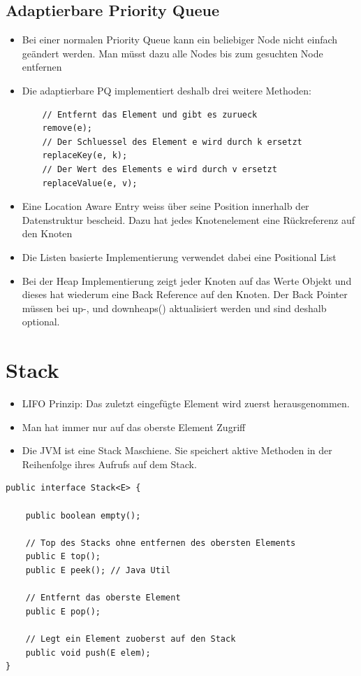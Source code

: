 \subsection{Adaptierbare Priority Queue} 
\begin{itemize}
	\item Bei einer normalen Priority Queue kann ein beliebiger Node nicht einfach geändert werden. Man müsst dazu alle Nodes bis zum gesuchten Node entfernen
	\item Die adaptierbare PQ implementiert deshalb drei weitere Methoden:
	\begin{lstlisting}
	// Entfernt das Element und gibt es zurueck
	remove(e);
	// Der Schluessel des Element e wird durch k ersetzt
	replaceKey(e, k);
	// Der Wert des Elements e wird durch v ersetzt
	replaceValue(e, v);
	\end{lstlisting}
	\item Eine Location Aware Entry weiss über seine Position innerhalb der Datenstruktur bescheid. Dazu hat jedes Knotenelement eine Rückreferenz auf den Knoten
	\item Die Listen basierte Implementierung verwendet dabei eine Positional List
	\item Bei der Heap Implementierung zeigt jeder Knoten auf das Werte Objekt und dieses hat wiederum eine Back Reference auf den Knoten. Der Back Pointer müssen bei up-, und downheaps() aktualisiert werden und sind deshalb optional.
\end{itemize}

\section{Stack}
\begin{itemize}
	\item LIFO Prinzip: Das zuletzt eingefügte Element wird zuerst herausgenommen.
	\item Man hat immer nur auf das oberste Element Zugriff
	\item Die JVM ist eine Stack Maschiene. Sie speichert aktive Methoden in der Reihenfolge ihres Aufrufs auf dem Stack.
\end{itemize}

\begin{lstlisting}
public interface Stack<E> {

	public boolean empty();
	
	// Top des Stacks ohne entfernen des obersten Elements
	public E top();
	public E peek(); // Java Util
	
	// Entfernt das oberste Element
	public E pop();
	
	// Legt ein Element zuoberst auf den Stack
	public void push(E elem);
}
\end{lstlisting}

